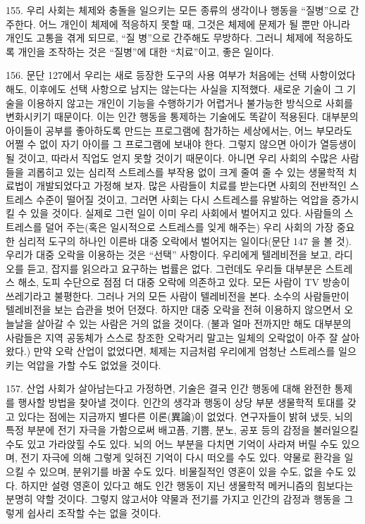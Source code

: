 \documentclass[11pt,a4paper]{article}
\begin{document}
\begin{multicols}{2}
155. 우리 사회는 체제와 충돌을 일으키는 모든 종류의 생각이나 행동을 “질병”으로 간주한다. 어느  개인이 체제에 적응하지 못할 때, 그것은 체제에 문제가 될 뿐만 아니라 개인도 고통을 겪게 되므로, “질
병”으로 간주해도 무방하다. 그러니 체제에 적응하도록 개인을 조작하는 것은 “질병”에 대한 “치료”이고,  좋은 일이다.  


156. 문단 127에서 우리는 새로 등장한 도구의 사용 여부가 처음에는 선택 사항이었다 해도, 이후에도  선택 사항으로 남지는 않는다는 사실을 지적했다. 새로운 기술이 그 기술을 이용하지 않고는 개인이  기능을 수행하기가 어렵거나 불가능한 방식으로 사회를 변화시키기 때문이다. 이는 인간 행동을  통제하는 기술에도 똑같이 적용된다. 대부분의 아이들이 공부를 좋아하도록 만드는 프로그램에  참가하는 세상에서는, 어느 부모라도 어쩔 수 없이 자기 아이를 그 프로그램에 보내야 한다. 그렇지  않으면 아이가 열등생이 될 것이고, 따라서 직업도 얻지 못할 것이기 때문이다. 아니면 우리 사회의  수많은 사람들을 괴롭히고 있는 심리적 스트레스를 부작용 없이 크게 줄여 줄 수 있는 생물학적 치료법이  개발되었다고 가정해 보자. 많은 사람들이 치료를 받는다면 사회의 전반적인 스트레스 수준이 떨어질  것이고, 그러면 사회는 다시 스트레스를 유발하는 억압을 증가시킬 수 있을 것이다. 실제로 그런 일이  이미 우리 사회에서 벌어지고 있다. 사람들의 스트레스를 덜어 주는(혹은 일시적으로 스트레스를 잊게  해주는) 우리 사회의 가장 중요한 심리적 도구의 하나인 이른바 대중 오락에서 벌어지는 일이다(문단 147 을 볼 것). 우리가 대중 오락을 이용하는 것은 “선택” 사항이다. 우리에게 텔레비전을 보고, 라디오를 듣고, 잡지를 읽으라고 요구하는 법률은 없다. 그런데도 우리들 대부분은 스트레스 해소, 도피 수단으로 점점 더 대중 오락에 의존하고 있다. 모든 사람이 TV 방송이 쓰레기라고 불평한다. 그러나 거의 모든 사람이  텔레비전을 본다. 소수의 사람들만이 텔레비전을 보는 습관을 벗어 던졌다. 하지만 대중 오락을 전혀 이용하지 않으면서 오늘날을 살아갈 수 있는 사람은 거의 없을 것이다. (불과 얼마 전까지만 해도  대부분의 사람들은 지역 공동체가 스스로 창조한 오락거리 말고는 일체의 오락없이 아주 잘 살아왔다.)  만약 오락 산업이 없었다면, 체제는 지금처럼 우리에게 엄청난 스트레스를 일으키는 억압을 가할 수도  없었을 것이다.  


157. 산업 사회가 살아남는다고 가정하면, 기술은 결국 인간 행동에 대해 완전한 통제를 행사할 방법을  찾아낼 것이다. 인간의 생각과 행동이 상당 부분 생물학적 토대를 갖고 있다는 점에는 지금까지 별다른  이론(異論)이 없었다. 연구자들이 밝혀 냈듯, 뇌의 특정 부분에 전기 자극을 가함으로써 배고픔, 기쁨,  분노, 공포 등의 감정을 불러일으킬 수도 있고 가라앉힐 수도 있다. 뇌의 어느 부분을 다치면 기억이  사라져 버릴 수도 있으며, 전기 자극에 의해 그렇게 잊혀진 기억이 다시 떠오를 수도 있다. 약물로 환각을  일으킬 수 있으며, 분위기를 바꿀 수도 있다. 비물질적인 영혼이 있을 수도, 없을 수도 있다. 하지만 설령 영혼이 있다고 해도 인간 행동이 지닌 생물학적 메커니즘의 힘보다는 분명히 약할 것이다. 그렇지  않고서야 약물과 전기를 가지고 인간의 감정과 행동을 그렇게 쉽사리 조작할 수는 없을 것이다.  



\end{multicols}
\end{document}
